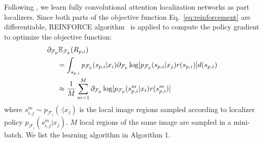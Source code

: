 \documentclass{article}
\begin{document}
Following \cite{nips1}, we learn fully convolutional attention localization networks as part localizers.
Since both parts of the objective function Eq.~\eqref{eq:reinforcement} are differentiable,
REINFORCE algorithm~\cite{bd20} is applied to compute the policy gradient to optimize the objective function:
\begin{eqnarray}
\partial_{\mathcal{F}_p} \mathbb{E}_{\mathcal{F}_p}(R_{p,i}) \hspace{2.5in}\\
= \int_{s_{p,i}} p_{\mathcal{F}_p} (s_{p,i}|x_i)   \partial_{\mathcal{F}_p} \log   [p_{\mathcal{F}_p}      (s_{p,i}|x_j)r(s_{p,i})] d(s_{p,i})  \nonumber \\
\approx \frac{1}{M} \sum_{m=1}^M  \partial_{\mathcal{F}_p} \log   [p_{\mathcal{F}_p}      (s^m_{p,i}|x_i)r(s^m_{p,i})]  \hspace{0.9in}  \nonumber
\end{eqnarray}
where $s^m_{i,j} \sim p_{\mathcal{F}_i} (\cdot|x_j)$ is the local image regions sampled according to localizer policy $p_{\mathcal{F}_i} (s^m_{i,j}|x_j)$.
$M$ local regions of the same image are sampled in a mini-batch.
We list the learning algorithm in Algorithm 1.
\end{document}
